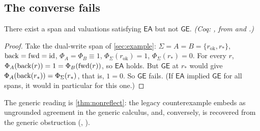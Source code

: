 \subsection{The converse fails}
\begin{prop}\label{prop:pairwise}
There exist a span and valuations satisfying $\mathsf{EA}$ but not $\mathsf{GE}$. \emph{(Coq: , from  and .)}
\end{prop}
\begin{proof}
Take the dual-write span of \cref{sec:example}: $\Sigma = A = B = \{r_{\mathrm{ok}}, r_*\}$, $\mathrm{back} = \mathrm{fwd} = \mathrm{id}$, $\Phi_A = \Phi_B \equiv 1$, $\Phi_\Sigma(r_{\mathrm{ok}}) = 1$, $\Phi_\Sigma(r_*) = 0$. For every $r$, $\Phi_A(\mathrm{back}(r)) = 1 = \Phi_B(\mathrm{fwd}(r))$, so $\mathsf{EA}$ holds. But $\mathsf{GE}$ at $r_*$ would give $\Phi_A(\mathrm{back}(r_*)) = \Phi_\Sigma(r_*)$, that is, $1 = 0$. So $\mathsf{GE}$ fails. (If $\mathsf{EA}$ implied $\mathsf{GE}$ for all spans, it would in particular for this one.)
\end{proof}
The generic reading is \cref{thm:nonreflect}: the legacy counterexample embeds as ungrounded agreement in the generic calculus, and, conversely,  is recovered from the generic obstruction (, ).

